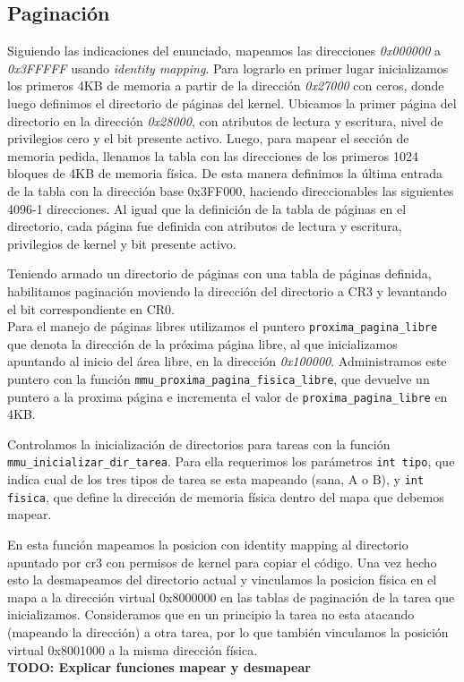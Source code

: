 \subsection{Paginación}

Siguiendo las indicaciones del enunciado, mapeamos las direcciones \textit{0x000000} a \textit{0x3FFFFF} usando \textit{identity mapping}.
Para lograrlo en primer lugar inicializamos los primeros 4KB de memoria a partir de la dirección \textit{0x27000} con ceros, donde luego definimos el directorio de páginas del kernel.
Ubicamos la primer página del directorio en la dirección \textit{0x28000}, con atributos de lectura y escritura, nivel de privilegios cero y el bit presente activo.
Luego, para mapear el sección de memoria pedida, llenamos la tabla con las direcciones de los primeros 1024 bloques de 4KB de memoria física. 
De esta manera definimos la última entrada de la tabla con la dirección base 0x3FF000, haciendo direccionables las siguientes 4096-1 direcciones. 
Al igual que la definición de la tabla de páginas en el directorio, cada página fue definida con atributos de lectura y escritura, privilegios de kernel y bit presente activo.

Teniendo armado un directorio de páginas con una tabla de páginas definida, habilitamos paginación moviendo la dirección del directorio a CR3 y levantando el bit correspondiente en CR0.\\

Para el manejo de páginas libres utilizamos el puntero \verb|proxima_pagina_libre| que denota la dirección de la próxima página libre, al que inicializamos apuntando al inicio del área libre, en la dirección \textit{0x100000}.
Administramos este puntero con la función \verb|mmu_proxima_pagina_fisica_libre|, que devuelve un puntero a la proxima página e incrementa el valor de \verb|proxima_pagina_libre| en 4KB.

Controlamos la inicialización de directorios para tareas con la función \verb|mmu_inicializar_dir_tarea|. 
Para ella requerimos los parámetros \verb|int tipo|, que indica cual de los tres tipos de tarea se esta mapeando (sana, A o B), y \verb|int fisica|, que define la dirección de memoria física dentro del mapa que debemos mapear. 


En esta función mapeamos la posicion con identity mapping al directorio apuntado por cr3 con permisos de kernel para copiar el código. 
Una vez hecho esto la desmapeamos del directorio actual y vinculamos la posicion física en el mapa a la dirección virtual 0x8000000 en las tablas de paginación de la tarea que inicializamos. 
Consideramos que en un principio la tarea no esta atacando (mapeando la dirección) a otra tarea, por lo que también vinculamos la posición virtual 0x8001000 a la misma dirección física.\\


{\LARGE \textbf{TODO: Explicar funciones mapear y desmapear}}

